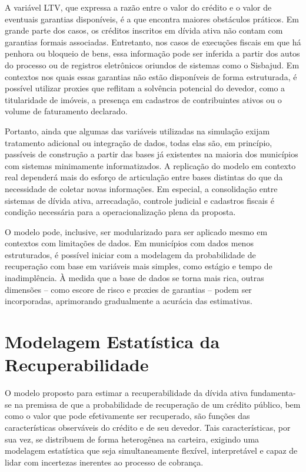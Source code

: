 \documentclass[a4paper,12pt]{article}
\begin{document}
A variável LTV, que expressa a razão entre o valor do crédito e o valor de eventuais garantias disponíveis, é a que encontra maiores obstáculos práticos. Em grande parte dos casos, os créditos inscritos em dívida ativa não contam com garantias formais associadas. Entretanto, nos casos de execuções fiscais em que há penhora ou bloqueio de bens, essa informação pode ser inferida a partir dos autos do processo ou de registros eletrônicos oriundos de sistemas como o Sisbajud. Em contextos nos quais essas garantias não estão disponíveis de forma estruturada, é possível utilizar proxies que reflitam a solvência potencial do devedor, como a titularidade de imóveis, a presença em cadastros de contribuintes ativos ou o volume de faturamento declarado.

Portanto, ainda que algumas das variáveis utilizadas na simulação exijam tratamento adicional ou integração de dados, todas elas são, em princípio, passíveis de construção a partir das bases já existentes na maioria dos municípios com sistemas minimamente informatizados. A replicação do modelo em contexto real dependerá mais do esforço de articulação entre bases distintas do que da necessidade de coletar novas informações. Em especial, a consolidação entre sistemas de dívida ativa, arrecadação, controle judicial e cadastros fiscais é condição necessária para a operacionalização plena da proposta.

O modelo pode, inclusive, ser modularizado para ser aplicado mesmo em contextos com limitações de dados. Em municípios com dados menos estruturados, é possível iniciar com a modelagem da probabilidade de recuperação com base em variáveis mais simples, como estágio e tempo de inadimplência. À medida que a base de dados se torna mais rica, outras dimensões – como escore de risco e proxies de garantias – podem ser incorporadas, aprimorando gradualmente a acurácia das estimativas.

\section{Modelagem Estatística da Recuperabilidade} 
O modelo proposto para estimar a recuperabilidade da dívida ativa fundamenta-se na premissa de que a probabilidade de recuperação de um crédito público, bem como o valor que pode efetivamente ser recuperado, são funções das características observáveis do crédito e de seu devedor. Tais características, por sua vez, se distribuem de forma heterogênea na carteira, exigindo uma modelagem estatística que seja simultaneamente flexível, interpretável e capaz de lidar com incertezas inerentes ao processo de cobrança.
\end{document}

